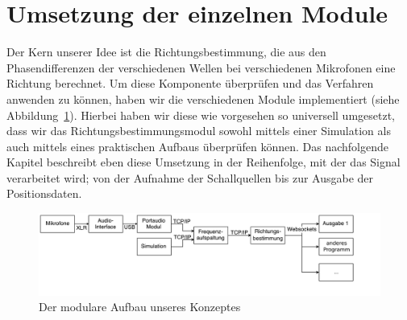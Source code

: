 \section{Umsetzung der einzelnen Module}
Der Kern unserer Idee ist die Richtungsbestimmung, die aus den Phasendifferenzen der verschiedenen Wellen bei verschiedenen Mikrofonen eine Richtung berechnet. Um diese Komponente überprüfen und das Verfahren anwenden zu können, haben wir die verschiedenen Module implementiert (siehe Abbildung~\ref{fig:flowchart}). Hierbei haben wir diese wie vorgesehen so universell umgesetzt, dass wir das Richtungsbestimmungsmodul sowohl mittels einer Simulation als auch mittels eines praktischen Aufbaus überprüfen können. Das nachfolgende Kapitel beschreibt eben diese Umsetzung in der Reihenfolge, mit der das Signal verarbeitet wird; von der Aufnahme der Schallquellen bis zur Ausgabe der Positionsdaten.
\begin{figure}[H]
	\includegraphics[width=\linewidth]{img/flowchart}
    \caption{Der modulare Aufbau unseres Konzeptes\label{fig:flowchart}}
\end{figure}

